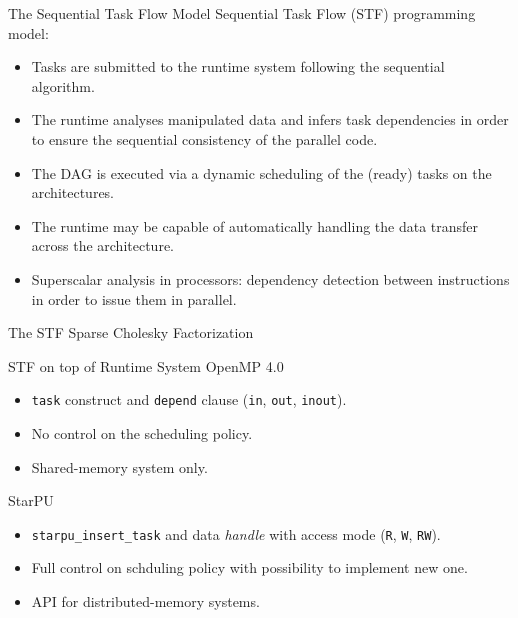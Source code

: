 \documentclass[unknownkeysallowed]{beamer}
\newcommand{\db}[1]{\textcolor{mblue}{#1\xspace}}
\begin{document}
\begin{frame}{The Sequential Task Flow Model}  
  \alert{Sequential Task Flow} (STF) programming model:

  \begin{itemize}
  \item Tasks are submitted to the runtime system following the
    \db{sequential algorithm}.
  \item The runtime analyses manipulated data and infers task
    dependencies in order to ensure the \db{sequential consistency} of
    the parallel code.
  \item The DAG is executed via a \db{dynamic scheduling} of the
    (ready) tasks on the architectures.
  \item The runtime may be capable of automatically handling the data
    transfer across the architecture.
  \item \db{Superscalar analysis} in processors: dependency detection
    between instructions in order to issue them in parallel.
  \end{itemize} 
\end{frame}

\begin{frame}[fragile,t]{The STF Sparse Cholesky Factorization}
  \only<1>{}
\end{frame}

\begin{frame}{STF on top of Runtime System}
  \alert{OpenMP 4.0}
  \begin{itemize}
  \item \texttt{task} construct and \texttt{depend} clause (\texttt{in}, \texttt{out},
    \texttt{inout}).
  \item No control on the scheduling policy.
  \item Shared-memory system only.
  \end{itemize}

  \vspace{0.5cm}

  \alert{StarPU}
  \begin{itemize}
  \item \texttt{starpu\_insert\_task} and data \textit{handle} with
    access mode (\texttt{R}, \texttt{W}, \texttt{RW}).
  \item Full control on schduling policy with possibility to implement
    new one.
  \item API for distributed-memory systems.
  \end{itemize}  
\end{frame}
\end{document}
